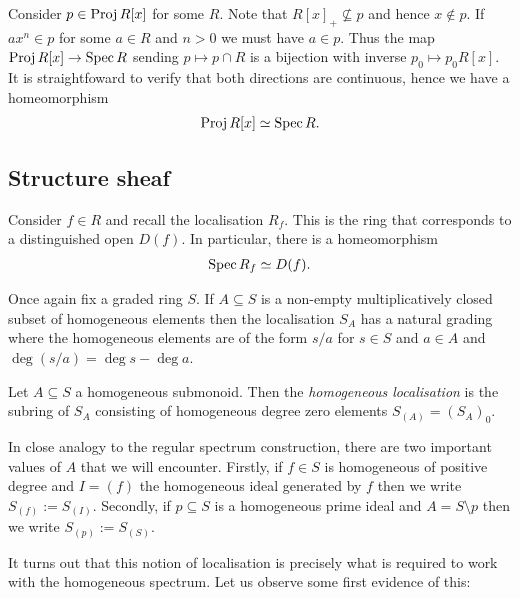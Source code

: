 \documentclass{article}
\begin{document}
\begin{example}
  Consider $p\in\operatorname{Proj} R[x]$ for some $R$.
  Note that $R[x]_+\not\subseteq p$ and
  hence $x\not\in p$. If $ax^n\in p$ for some $a\in R$ and $n>0$
  we must have $a\in p$. Thus the map $\operatorname{Proj} R[x] \to \operatorname{Spec} R$
  sending $p \mapsto p \cap R$ is a bijection with inverse
  $p_0 \mapsto p_0 R[x]$. It is straightfoward to verify that both
  directions are continuous, hence we have a homeomorphism
  \begin{align*}
    \operatorname{Proj} R[x] \simeq \operatorname{Spec} R.
  \end{align*}
\end{example}

\subsection{Structure sheaf}


Consider $f\in R$ and recall the localisation $R_f$. This is the ring
that corresponds to a distinguished open $D(f)$. In particular,
there is a homeomorphism
\begin{align*}
  \operatorname{Spec} R_f \simeq D(f).
\end{align*}

Once again fix a graded ring $S$.
If $A\subseteq S$ is a non-empty multiplicatively closed subset
of homogeneous elements then the localisation $S_A$ has a
natural grading 
where the homogeneous elements are of the form $s/a$ for $s\in S$
and $a\in A$ and $\deg(s/a) = \deg s - \deg a$.

\begin{definition}
  Let $A\subseteq S$ a homogeneous submonoid. Then the \emph{homogeneous
  localisation} is the subring of $S_A$ consisting of homogeneous degree zero
  elements $S_{(A)} = (S_A)_0$.
\end{definition}

In close analogy to the regular spectrum construction, there are two important
values of $A$ that we will encounter. Firstly, if $f\in S$ is homogeneous of
positive degree and $I=(f)$ the homogeneous ideal generated by $f$ then we
write $S_{(f)}:=S_{(I)}$. Secondly, if $p\subseteq S$ is a homogeneous prime
ideal and $A=S\setminus p$ then we write $S_{(p)} := S_{(S)}$.

It turns out that this notion of localisation is precisely what is
required to work with the homogeneous spectrum. Let us observe some
first evidence of this:
\end{document}
